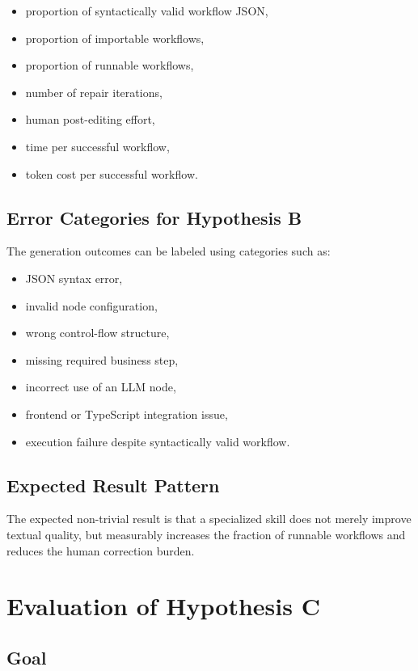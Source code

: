 \documentclass[12pt,a4paper]{article}
\begin{document}
\begin{itemize}
  \item proportion of syntactically valid workflow JSON,
  \item proportion of importable workflows,
  \item proportion of runnable workflows,
  \item number of repair iterations,
  \item human post-editing effort,
  \item time per successful workflow,
  \item token cost per successful workflow.
\end{itemize}

\subsection{Error Categories for Hypothesis B}

The generation outcomes can be labeled using categories such as:

\begin{itemize}
  \item JSON syntax error,
  \item invalid node configuration,
  \item wrong control-flow structure,
  \item missing required business step,
  \item incorrect use of an LLM node,
  \item frontend or TypeScript integration issue,
  \item execution failure despite syntactically valid workflow.
\end{itemize}

\subsection{Expected Result Pattern}

The expected non-trivial result is that a specialized skill does not merely improve textual quality, but measurably increases the fraction of runnable workflows and reduces the human correction burden.

\section{Evaluation of Hypothesis C}

\subsection{Goal}
\end{document}
